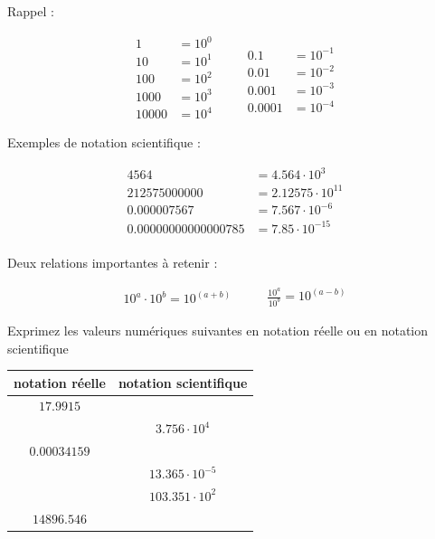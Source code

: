 \documentclass[
  11pt,
  a4paper,
  openany]{book}
\begin{document}
Rappel :

\[ \begin{split}
    1 &= 10^0\\
    10 &= 10^1\\
    100 &= 10^2\\
    1000 &= 10^3\\
    10000 &= 10^4
\end{split}
\qquad
\begin{split}
    \\
    0.1 &= 10^{-1}\\
    0.01 &= 10^{-2}\\
    0.001 &= 10^{-3}\\
    0.0001 &= 10^{-4}
\end{split} \]

Exemples de notation scientifique :

\[ \begin{split}
    4564 &= 4.564\cdot10^3\\
    212575000000 &= 2.12575\cdot10^{11}\\
    0.000007567 &= 7.567\cdot10^{-6}\\
    0.00000000000000785 &= 7.85\cdot10^{-15}\\
\end{split} \]

\clearpage

Deux relations importantes à retenir :

\[ \begin{split}
    10^a \cdot 10^b = 10^{(a+b)}
\end{split}
\qquad
\begin{split}
    \frac{10^a}{10^b} = 10^{(a-b)}
\end{split} \]

\begin{Exercise}
Exprimez les valeurs numériques suivantes en notation réelle ou en notation scientifique

\end{Exercise}

\begin{longtable}[]{@{}cc@{}}
\toprule()
notation réelle & notation scientifique \\
\midrule()
\endhead
\(17.9915\) & \\
& \(3.756 \cdot 10^{4}\) \\
\(0.00034159\) & \\
& \(13.365 \cdot 10^{-5}\) \\
& \(103.351 \cdot 10 ^{2}\) \\
\(14896.546\) & \\
\bottomrule()
\end{longtable}
\end{document}
